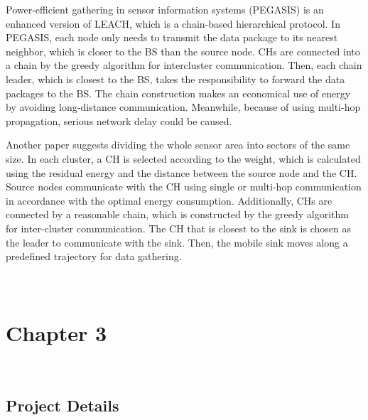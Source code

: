 \documentclass{article}
\begin{document}
Power-efficient gathering in sensor information systems (PEGASIS) is an enhanced version of LEACH, which is a chain-based hierarchical protocol. In PEGASIS, each node only needs to transmit the data package to its nearest neighbor, which is closer to the BS than the source node. CHs are connected into a chain by the greedy algorithm for intercluster communication. Then, each chain leader, which is closest to the BS, takes the responsibility to forward the data packages to the BS. The chain construction makes an economical use of energy by avoiding long-distance communication. Meanwhile, because of using multi-hop propagation, serious network delay could be caused.

Another paper suggests dividing the whole sensor area into sectors of the same size. In each cluster, a CH is selected according to the weight, which is calculated using the residual energy and the distance between the source node and the CH. Source nodes communicate with the CH using single or multi-hop communication in accordance with the optimal energy consumption. Additionally, CHs are connected by a reasonable chain, which is constructed by the greedy algorithm for inter-cluster communication. The CH that is closest to the sink is chosen as the leader to communicate with the sink. Then, the mobile sink moves along a predefined trajectory for data gathering.
\\
\\
\\
\chapter{\textbf{Chapter 3}}\\
\section{Project Details}
\\
\end{document}
